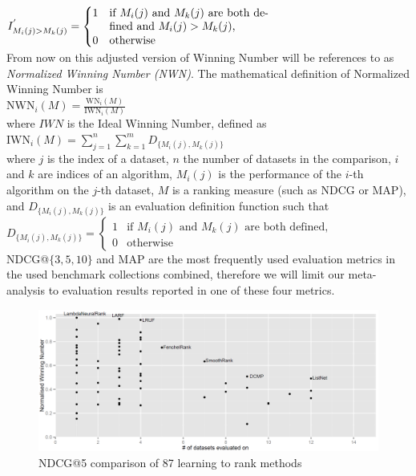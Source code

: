 \documentclass{sig-alternate}
\begin{document}
$I^{'}_{M_i(j)>M_k(j)} = \begin{cases}
1 & \parbox[t]{5cm}{if $M_i(j)$ and $M_k(j)$ are both defined and $M_i(j) > M_k(j)$,}\\
0 & \parbox[t]{5cm}{otherwise}
\end{cases}$\\

From now on this adjusted version of Winning Number will be references to as \emph{Normalized Winning Number (NWN)}. The mathematical definition of Normalized Winning Number is\\

$\text{NWN}_i(M) = \frac{\text{WN}_i(M)}{\text{IWN}_i(M)}$\\

\noindent
where $IWN$ is the Ideal Winning Number, defined as\\

$\text{IWN}_i(M) = \sum\nolimits_{j=1}^n \sum\nolimits_{k=1}^m D_{\{M_i(j),M_k(j)\}}$\\

where $j$ is the index of a dataset, $n$ the number of datasets in the comparison, $i$ and $k$ are indices of an algorithm, $M_i(j)$ is the performance of the $i$-th algorithm on the $j$-th dataset, $M$ is a ranking measure (such as NDCG or MAP), and $D_{\{M_i(j),M_k(j)\}}$ is an evaluation definition function such that\\

$D_{\{M_i(j),M_k(j)\}} = \begin{cases}
1 & \text{if } M_i(j) \text{ and } M_k(j) \text{ are both defined}, \\
0 & \text{otherwise}
\end{cases}$\\

NDCG@$\{3,5,10\}$ and MAP are the most frequently used evaluation metrics in the used benchmark collections combined, therefore we will limit our meta-analysis to evaluation results reported in one of these four metrics.

\begin{figure}
\includegraphics[scale=0.19]{gfx/ndcg5_winnum}
\caption{NDCG@5 comparison of 87 learning to rank methods}
\label{fig:normalized_winning_number_ndcg5}
\end{figure}
\end{document}
